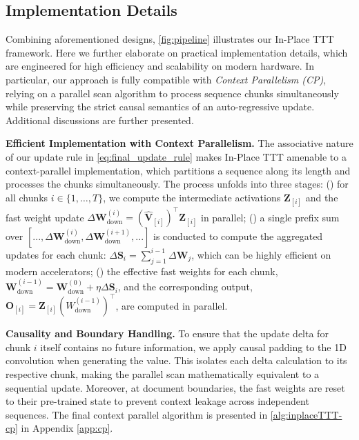 \subsection{Implementation Details}
\label{sec:implement}


Combining aforementioned designs, \cref{fig:pipeline} illustrates our In-Place TTT framework. Here we further elaborate on practical implementation details, which are engineered for high efficiency and scalability on modern hardware. In particular, our approach is fully compatible with \textit{Context Parallelism (CP)}, relying on a parallel scan algorithm to process sequence chunks simultaneously while preserving the strict causal semantics of an auto-regressive update. Additional discussions are further presented.

\textbf{Efficient Implementation with Context Parallelism.}
The associative nature of our update rule in \cref{eq:final_update_rule} makes In-Place TTT amenable to a context-parallel implementation, which partitions a sequence along its length and processes the chunks simultaneously. The process unfolds into three stages: () for all chunks $i \in \{1, \dots, T\}$, we compute the intermediate activations $\mathbf{Z}_{[i]}$ and the fast weight update $\Delta \mathbf{W}_{\mathrm{down}}^{(i)} = (\hat{\mathbf{V}}_{[i]})^\top \mathbf{Z}_{[i]}$ in parallel; () a single prefix sum over $[...,\Delta \mathbf{W}_{\mathrm{down}}^{(i)},\Delta \mathbf{W}_{\mathrm{down}}^{(i+1)},...]$ is conducted to compute the aggregated updates for each chunk: $\Delta \mathbf{S}_i = \sum_{j=1}^{i-1} \Delta \mathbf{W}_j$, which can be highly efficient on modern accelerators; () the effective fast weights for each chunk, $\mathbf{W}_{\mathrm{down}}^{(i-1)} = \mathbf{W}_{\mathrm{down}}^{(0)} + \eta \Delta\mathbf{S}_i$, and the corresponding output, $\mathbf{O}_{[i]} = \mathbf{Z}_{[i]} (W_{\mathrm{down}}^{(i-1)})^\top$, are computed in parallel.

\textbf{Causality and Boundary Handling.}
To ensure that the update delta for chunk $i$ itself contains no future information, we apply causal padding to the 1D convolution when generating the value. This isolates each delta calculation to its respective chunk, making the parallel scan mathematically equivalent to a sequential update. Moreover, at document boundaries, the fast weights are reset to their pre-trained state to prevent context leakage across independent sequences. The final context parallel algorithm is presented in \cref{alg:inplaceTTT-cp} in Appendix \ref{app:cp}.

